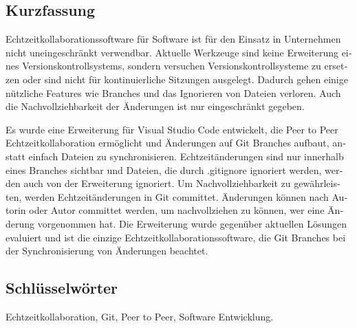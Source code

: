 
\cleardoublepage
{}




\begin{otherlanguage}{ngerman}

  \chapter*{Kurzfassung}

  Echtzeitkollaborationssoftware für Software ist für den Einsatz in Unternehmen nicht uneingeschränkt verwendbar. Aktuelle Werkzeuge sind keine Erweiterung eines Versionskontrollsystems, sondern versuchen Versionskontrollsysteme zu ersetzen oder sind nicht für kontinuierliche Sitzungen ausgelegt. Dadurch gehen einige nützliche Features wie Branches und das Ignorieren von Dateien verloren. Auch die Nachvollziehbarkeit der Änderungen ist nur eingeschränkt gegeben.
  
  Es wurde eine Erweiterung für Visual Studio Code entwickelt, die Peer to Peer Echtzeitkollaboration ermöglicht und Änderungen auf Git Branches aufbaut, anstatt einfach Dateien zu synchronisieren. Echtzeitänderungen sind nur innerhalb eines Branches sichtbar und Dateien, die durch .gitignore ignoriert werden, werden auch von der Erweiterung ignoriert. Um Nachvollziehbarkeit zu gewährleisten, werden Echtzeitänderungen in Git committet. Änderungen können nach Autorin oder Autor committet werden, um nachvollziehen zu können, wer eine Änderung vorgenommen hat. Die Erweiterung wurde gegenüber aktuellen Lösungen evaluiert und ist die einzige Echtzeitkollaborationssoftware, die Git Branches bei der Synchronisierung von Änderungen beachtet.

	

  \bigskip

  \section*{Schl\"usselw\"orter}
  Echtzeitkollaboration, Git, Peer to Peer,  Software Entwicklung.

\end{otherlanguage}

